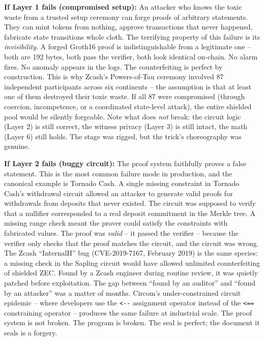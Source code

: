 \documentclass[
  11pt,
  openany]{report}
\renewcommand{\textbf}[1]{{\bfseries\color{MidnightBold}#1}}
\begin{document}
\textbf{If Layer 1 fails (compromised setup):} An attacker who knows the toxic
waste from a trusted setup ceremony can forge proofs of arbitrary statements.
They can mint tokens from nothing, approve transactions that never happened,
fabricate state transitions whole cloth. The terrifying property of this failure
is its \emph{invisibility}. A forged Groth16 proof is indistinguishable from a
legitimate one -- both are 192 bytes, both pass the verifier, both look
identical on-chain. No alarm fires. No anomaly appears in the logs. The
counterfeiting is perfect by construction. This is why Zcash's Powers-of-Tau
ceremony involved 87 independent participants across six continents -- the
assumption is that at least one of them destroyed their toxic waste. If all 87
were compromised (through coercion, incompetence, or a coordinated state-level
attack), the entire shielded pool would be silently forgeable. Note what does
\emph{not} break: the circuit logic (Layer 2) is still correct, the witness
privacy (Layer 3) is still intact, the math (Layer 6) still holds. The stage was
rigged, but the trick's choreography was genuine.

\textbf{If Layer 2 fails (buggy circuit):} The proof system faithfully proves a
false statement. This is the most common failure mode in production, and the
canonical example is Tornado Cash. A single missing constraint in Tornado Cash's
withdrawal circuit allowed an attacker to generate valid proofs for withdrawals
from deposits that never existed. The circuit was supposed to verify that a
nullifier corresponded to a real deposit commitment in the Merkle tree. A
missing range check meant the prover could satisfy the constraints with
fabricated values. The proof was \emph{valid} -- it passed the verifier --
because the verifier only checks that the proof matches the circuit, and the
circuit was wrong. The Zcash ``InternalH'' bug (CVE-2019-7167, February 2019) is
the same species: a missing check in the Sapling circuit would have allowed
unlimited counterfeiting of shielded ZEC. Found by a Zcash engineer during
routine review, it was quietly patched before exploitation. The gap between
``found by an auditor'' and ``found by an attacker'' was a matter of months.
Circom's under-constrained circuit epidemic -- where developers use the
\texttt{\textless{}-\/-} assignment operator instead of the
\texttt{\textless{}==} constraining operator -- produces the same failure at
industrial scale. The proof system is not broken. The program is broken. The
seal is perfect; the document it seals is a forgery.
\end{document}
